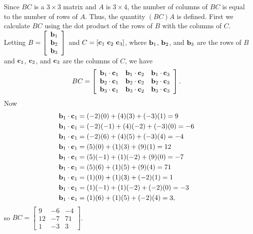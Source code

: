 \begin{example}
\item Since $BC$ is a $3 \times 3$ matrix and $A$ is $3 \times 4$, the number of columns of $BC$ is equal to the number of rows of $A$. Thus, the quantity $(BC)A$ is defined. First we calculate $BC$ using the dot product of the rows of $B$ with the columns of $C$. Letting $B = \left[ \begin{array}{c} \mathbf{b}_1 \\ \mathbf{b}_2 \\ \mathbf{b}_3 \end{array} \right]$ and $C = [\mathbf{c}_1 \ \mathbf{c}_2 \ \mathbf{c}_3]$, where $\mathbf{b}_1$, $\mathbf{b}_2$, and $\mathbf{b}_3$ are the rows of $B$ and $\mathbf{c}_1$, $\mathbf{c}_2$, and $\mathbf{c}_3$ are the columns of $C$, we have 
\[BC = \left[ \begin{array}{ccc} \mathbf{b}_1 \cdot \mathbf{c}_1 & \mathbf{b}_1 \cdot \mathbf{c}_2 & \mathbf{b}_1 \cdot \mathbf{c}_3 \\ \mathbf{b}_2 \cdot \mathbf{c}_1 & \mathbf{b}_2 \cdot \mathbf{c}_2 & \mathbf{b}_2 \cdot \mathbf{c}_3 \\ \mathbf{b}_3 \cdot \mathbf{c}_1 & \mathbf{b}_3 \cdot \mathbf{c}_2 & \mathbf{b}_3 \cdot \mathbf{c}_3 \end{array} \right].\]
Now 
\begin{align*}
\mathbf{b}_1 \cdot \mathbf{c}_1 &= (-2)(0)+(4)(3)+(-3)(1) = 9 \\
\mathbf{b}_1 \cdot \mathbf{c}_1 &= (-2)(-1)+(4)(-2)+(-3)(0) = -6 \\
\mathbf{b}_1 \cdot \mathbf{c}_1 &= (-2)(6)+(4)(5)+(-3)(4) = -4 \\ 
\mathbf{b}_1 \cdot \mathbf{c}_1 &= (5)(0)+(1)(3)+(9)(1) = 12 \\
\mathbf{b}_1 \cdot \mathbf{c}_1 &= (5)(-1)+(1)(-2)+(9)(0) = -7 \\
\mathbf{b}_1 \cdot \mathbf{c}_1 &= (5)(6)+(1)(5)+(9)(4) = 71 \\ 
\mathbf{b}_1 \cdot \mathbf{c}_1 &=(1)(0)+(1)(3)+(-2)(1) = 1 \\
\mathbf{b}_1 \cdot \mathbf{c}_1 &= (1)(-1)+(1)(-2)+(-2)(0) = -3 \\
\mathbf{b}_1 \cdot \mathbf{c}_1 &= (1)(6)+(1)(5)+(-2)(4) = 3, 
\end{align*}
so $BC = \left[ \begin{array}{crr} 9&-6&-4 \\ 12&-7&71 \\ 1&-3&3 \end{array} \right]$. 

\end{example}
